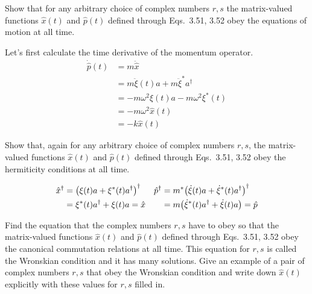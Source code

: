 \documentclass[boxes,pages]{homework}
\makeatletter
\numberwithin{@problem}{section}
\makeatother
\begin{document}
\setcounter{section}{3}

\begin{problem}
Show that for any arbitrary choice of complex numbers $r, s$ the matrix-valued functions $\hat{x}(t)$ and $\hat{p}(t)$ defined through Eqs.\ 3.51, 3.52 obey the equations of motion at all time.
\end{problem}

\begin{solution}
	Let's first calculate the time derivative of the momentum operator.
	\begin{align*}
		\dot{\hat{p}}(t) & = m\ddot{\hat{x}} \\
		 & = m\ddot{\xi}(t)a + m\ddot{\xi}^*a^\dagger \\
		 & = -m\omega^2\xi(t)a - m\omega^2\xi^*(t) \\
		 & = -m\omega^2\hat{x}(t) \\
		 & = -k\hat{x}(t)
	\end{align*}
\end{solution}

\begin{problem}
	Show that, again for any arbitrary choice of complex numbers $r, s$, the matrix-valued functions $\hat{x}(t)$ and $\hat{p}(t)$ defined through Eqs.\ 3.51, 3.52 obey the hermiticity conditions at all time.
\end{problem}

\begin{solution}
	\begin{align*}
		\hat{x}^\dagger & = \qty(\xi(t)a +\xi^*(t)a^\dagger)^\dagger & \hat{p}^\dagger & = m^*\qty(\dot{\xi}(t)a + \dot{\xi}^*(t)a^\dagger)^\dagger \\
										& = \xi^*(t)a^\dagger + \xi(t)a = \hat{x} & & = m\qty(\dot{\xi}^*(t)a^\dagger + \dot{\xi}(t)a) = \hat{p}
	\end{align*}
\end{solution}

\begin{problem}
Find the equation that the complex numbers $r, s$ have to obey so that the matrix-valued functions $\hat{x}(t)$ and $\hat{p}(t)$ defined through Eqs.\ 3.51, 3.52 obey the canonical commutation relations at all time. This equation for $r, s$ is called the Wronskian condition and it has many solutions. Give an example of a pair of complex numbers $r, s$ that obey the Wronskian condition and write down $\hat{x}(t)$ explicitly with these values for $r, s$ filled in.
\end{problem}
\end{document}
